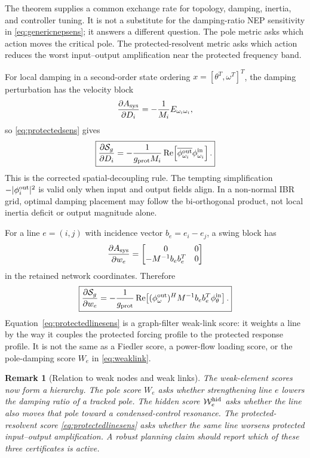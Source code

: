 \documentclass[journal]{IEEEtran}
\newtheorem{remark}{Remark}
\newcommand{\Real}{\operatorname{Re}}
\begin{document}
The theorem supplies a common exchange rate for topology, damping, inertia, and controller tuning. It is not a substitute for the damping-ratio NEP sensitivity in \eqref{eq:genericnepsens}; it answers a different question. The pole metric asks which action moves the critical pole. The protected-resolvent metric asks which action reduces the worst input--output amplification near the protected frequency band.

For local damping in a second-order state ordering $x=[\theta^T,\omega^T]^T$, the damping perturbation has the velocity block
\begin{equation}
\frac{\partial A_{\rm sys}}{\partial D_i}
=
-\frac{1}{M_i}E_{\omega_i\omega_i},
\end{equation}
so \eqref{eq:protectedsens} gives
\begin{equation}
\boxed{
\frac{\partial \mathcal{S}_g}{\partial D_i}
=
-\frac{1}{g_{\rm prot}M_i}
\Real\!\left[
\overline{\phi^{\rm out}_{\omega_i}}
\phi^{\rm in}_{\omega_i}
\right].}
\label{eq:protectedDsens}
\end{equation}
This is the corrected spatial-decoupling rule. The tempting simplification $-|\phi_i^{\rm out}|^2$ is valid only when input and output fields align. In a non-normal IBR grid, optimal damping placement may follow the bi-orthogonal product, not local inertia deficit or output magnitude alone.

For a line $e=(i,j)$ with incidence vector $b_e=e_i-e_j$, a swing block has
\begin{equation}
\frac{\partial A_{\rm sys}}{\partial w_e}
=
\begin{bmatrix}
0&0\\
-M^{-1}b_eb_e^T&0
\end{bmatrix}
\end{equation}
in the retained network coordinates. Therefore
\begin{equation}
\boxed{
\frac{\partial \mathcal{S}_g}{\partial w_e}
=
-\frac{1}{g_{\rm prot}}
\Real\!\left[
(\phi_{\omega}^{\rm out})^H
M^{-1}b_eb_e^T\phi_{\theta}^{\rm in}
\right].}
\label{eq:protectedlinesens}
\end{equation}
Equation~\eqref{eq:protectedlinesens} is a graph-filter weak-link score: it weights a line by the way it couples the protected forcing profile to the protected response profile. It is not the same as a Fiedler score, a power-flow loading score, or the pole-damping score $W_e$ in \eqref{eq:weaklink}.

\begin{remark}[Relation to weak nodes and weak links]
The weak-element scores now form a hierarchy. The pole score $W_e$ asks whether strengthening line $e$ lowers the damping ratio of a tracked pole. The hidden score $\mathcal{W}_e^{\rm hid}$ asks whether the line also moves that pole toward a condensed-control resonance. The protected-resolvent score \eqref{eq:protectedlinesens} asks whether the same line worsens protected input--output amplification. A robust planning claim should report which of these three certificates is active.
\end{remark}
\end{document}
